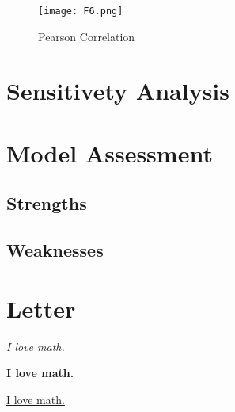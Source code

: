 \documentclass{mcmthesis}  %
\begin{document}
\begin{figure}[h]  %
        \small
        \centering  %
        \texttt{[image: F6.png]}  %
        \caption{Pearson Correlation} \label{Figure6}  %
\end{figure}  %

\section{Sensitivety Analysis}  %

\section{Model Assessment}

\subsection{Strengths}
\subsection{Weaknesses}

\section{Letter}


 \textit{I love math.}  %

\textbf{I love math.}  %

\underline{I love math.}  %
\end{document}
